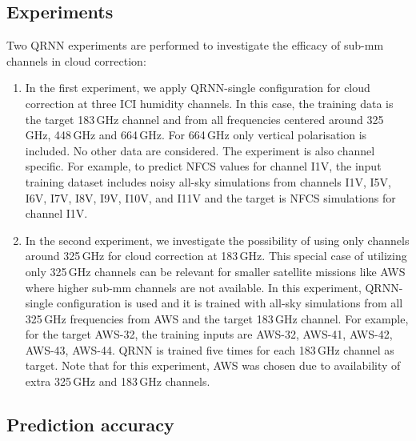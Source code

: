 \documentclass[amt, manuscript]{copernicus}
\begin{document}
\subsection{Experiments}
%
Two QRNN experiments are performed to investigate the efficacy of sub-mm channels in cloud correction: 
\begin{enumerate}
	\item In the first experiment, we apply QRNN-single configuration for cloud correction at three ICI humidity channels. In this case, the training data is the target 183\,GHz channel and from all frequencies  centered around 325\,GHz, 448\,GHz and 664\,GHz. For 664\,GHz only vertical polarisation is included. No other data are considered. The experiment is also channel specific. For example, to predict NFCS values for channel I1V, the input training dataset includes noisy all-sky simulations from channels I1V, I5V, I6V, I7V, I8V, I9V, I10V, and I11V and the target is NFCS simulations for channel I1V.
	
	\item In the second experiment, we investigate the possibility of using only channels around 325\,GHz for cloud correction at 183\,GHz. This special case of utilizing only 325\,GHz channels can be relevant for smaller satellite missions like AWS where higher sub-mm channels are not available. In this experiment, QRNN-single configuration is used and it is trained with all-sky simulations from all 325\,GHz frequencies from AWS and the target 183\,GHz channel. For example, for the target AWS-32, the training inputs are AWS-32, AWS-41, AWS-42, AWS-43, AWS-44. QRNN is trained five times for each 183\,GHz channel as target. Note that for this experiment, AWS was chosen due to availability of extra 325\,GHz and 183\,GHz channels. 	
\end{enumerate}	

\subsection{Prediction accuracy}
\end{document}
